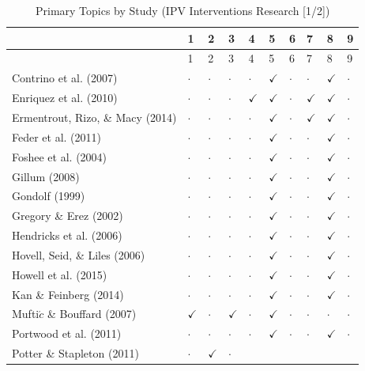 \documentclass[11pt,]{tufte-book}
\begin{document}
\begin{longtable}[]{@{}llllllllll@{}}
\caption{Primary Topics by Study (IPV Interventions Research {[}1/2{]})
\label{tbl:ks3tp}}\tabularnewline
\toprule
& 1 & 2 & 3 & 4 & 5 & 6 & 7 & 8 & 9\tabularnewline
\midrule
\endfirsthead
\toprule
& 1 & 2 & 3 & 4 & 5 & 6 & 7 & 8 & 9\tabularnewline
\midrule
\endhead
Contrino et al. (2007) & \(\cdot\) & \(\cdot\) & \(\cdot\) & \(\cdot\) &
\(\checkmark\) & \(\cdot\) & \(\cdot\) & \(\checkmark\) &
\(\cdot\)\tabularnewline
Enriquez et al. (2010) & \(\cdot\) & \(\cdot\) & \(\cdot\) &
\(\checkmark\) & \(\checkmark\) & \(\cdot\) & \(\checkmark\) &
\(\checkmark\) & \(\cdot\)\tabularnewline
Ermentrout, Rizo, \& Macy (2014) & \(\cdot\) & \(\cdot\) & \(\cdot\) &
\(\cdot\) & \(\checkmark\) & \(\cdot\) & \(\checkmark\) & \(\checkmark\)
& \(\cdot\)\tabularnewline
Feder et al. (2011) & \(\cdot\) & \(\cdot\) & \(\cdot\) & \(\cdot\) &
\(\checkmark\) & \(\cdot\) & \(\cdot\) & \(\checkmark\) &
\(\cdot\)\tabularnewline
Foshee et al. (2004) & \(\cdot\) & \(\cdot\) & \(\cdot\) & \(\cdot\) &
\(\checkmark\) & \(\cdot\) & \(\cdot\) & \(\checkmark\) &
\(\cdot\)\tabularnewline
Gillum (2008) & \(\cdot\) & \(\cdot\) & \(\cdot\) & \(\cdot\) &
\(\checkmark\) & \(\cdot\) & \(\cdot\) & \(\checkmark\) &
\(\cdot\)\tabularnewline
Gondolf (1999) & \(\cdot\) & \(\cdot\) & \(\cdot\) & \(\cdot\) &
\(\checkmark\) & \(\cdot\) & \(\cdot\) & \(\checkmark\) &
\(\cdot\)\tabularnewline
Gregory \& Erez (2002) & \(\cdot\) & \(\cdot\) & \(\cdot\) & \(\cdot\) &
\(\checkmark\) & \(\cdot\) & \(\cdot\) & \(\checkmark\) &
\(\cdot\)\tabularnewline
Hendricks et al. (2006) & \(\cdot\) & \(\cdot\) & \(\cdot\) & \(\cdot\)
& \(\checkmark\) & \(\cdot\) & \(\cdot\) & \(\checkmark\) &
\(\cdot\)\tabularnewline
Hovell, Seid, \& Liles (2006) & \(\cdot\) & \(\cdot\) & \(\cdot\) &
\(\cdot\) & \(\checkmark\) & \(\cdot\) & \(\cdot\) & \(\checkmark\) &
\(\cdot\)\tabularnewline
Howell et al. (2015) & \(\cdot\) & \(\cdot\) & \(\cdot\) & \(\cdot\) &
\(\checkmark\) & \(\cdot\) & \(\cdot\) & \(\checkmark\) &
\(\cdot\)\tabularnewline
Kan \& Feinberg (2014) & \(\cdot\) & \(\cdot\) & \(\cdot\) & \(\cdot\) &
\(\checkmark\) & \(\cdot\) & \(\cdot\) & \(\checkmark\) &
\(\cdot\)\tabularnewline
Mufti\(\acute{c}\) \& Bouffard (2007) & \(\checkmark\) & \(\cdot\) &
\(\checkmark\) & \(\cdot\) & \(\checkmark\) & \(\cdot\) & \(\cdot\) &
\(\cdot\) & \(\cdot\)\tabularnewline
Portwood et al. (2011) & \(\cdot\) & \(\cdot\) & \(\cdot\) & \(\cdot\) &
\(\checkmark\) & \(\cdot\) & \(\cdot\) & \(\checkmark\) &
\(\cdot\)\tabularnewline
Potter \& Stapleton (2011) & \(\cdot\) & \(\checkmark\) & \(\cdot\) &

\end{longtable}
\end{document}
